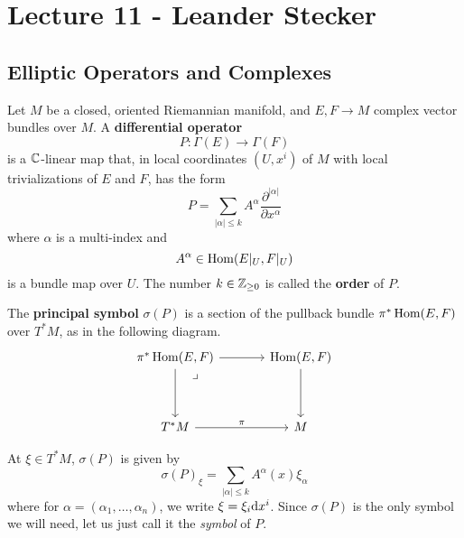 \chapter{Lecture 11 - Leander Stecker}

\section{Elliptic Operators and Complexes}

Let $M$ be a closed, oriented Riemannian manifold, and $E, F \to M$ complex vector bundles over $M$.
A \textbf{differential operator}
\begin{equation*}
  P \colon \Gamma (E) \longrightarrow \Gamma(F)
\end{equation*}
is a $\mathbb{C}$-linear map that, in local coordinates $(U, x^i)$ of $M$ with local trivializations of $E$ and $F$, has the form
\begin{equation*}
  P = \sum_{|\alpha| \leq k} A^\alpha
  \frac{\partial^{|\alpha|} }{\partial x^{\alpha}} 
\end{equation*}
where $\alpha$ is a multi-index and
\begin{equation*}
  A^\alpha \in \operatorname{Hom} ( E |_U, F |_U )
\end{equation*}
is a bundle map over $U$.
The number $k \in \mathbb{Z}_{\geq 0}$ is called the \textbf{order} of $P$.

\begin{definition}
  The \textbf{principal symbol} $\sigma(P)$ is a section of the pullback bundle
  $\pi^* \operatorname{Hom}(E, F)$ over $T^*M$, as in the following diagram.
  \begin{equation*}
    \begin{tikzcd}[sep=large]
      |[label={-45:\lrcorner}]|
      \pi^* \Hom(E, F) \arrow[r] \arrow[d] &
      \Hom(E, F) \arrow[d] \\
      T^* M \arrow[r, "\pi"] &
      M
    \end{tikzcd}
  \end{equation*}
\end{definition}

At $\xi \in T^* M$, $\sigma(P)$ is given by
\begin{equation*}
  \sigma(P)_\xi = \sum_{|\alpha| \leq k} A^\alpha (x) \xi_\alpha
\end{equation*}
where for $\alpha = (\alpha_1, \dots, \alpha_n)$, we write $\xi = \xi_i \mathrm{d} x^i$.
Since $\sigma(P)$ is the only symbol we will need, let us just call it the \textit{symbol} of $P$.

